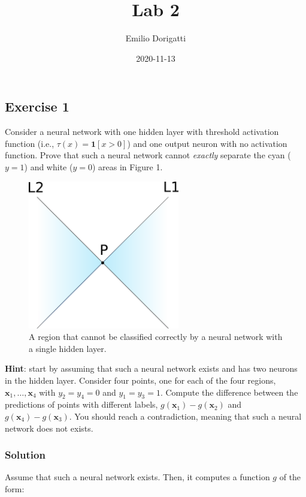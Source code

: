 \documentclass[
]{article}
\title{Lab 2}
\author{Emilio Dorigatti}
\date{2020-11-13}
\begin{document}
\maketitle

\hypertarget{exercise-1}{%
\subsection{Exercise 1}\label{exercise-1}}

Consider a neural network with one hidden layer with threshold
activation function (i.e., \(\tau(x)=\mathbf{1}[x>0]\)) and one output
neuron with no activation function. Prove that such a neural network
cannot \emph{exactly} separate the cyan (\(y=1\)) and white (\(y=0\))
areas in Figure 1.

\begin{figure}
\centering
\includegraphics[width=2.60417in,height=\textheight]{lab2f1.png}
\caption{A region that cannot be classified correctly by a neural
network with a single hidden layer.}
\end{figure}

\textbf{Hint}: start by assuming that such a neural network exists and
has two neurons in the hidden layer. Consider four points, one for each
of the four regions, \(\textbf{x}_1,\ldots,\textbf{x}_4\) with
\(y_2=y_4=0\) and \(y_1=y_3=1\). Compute the difference between the
predictions of points with different labels,
\(g(\textbf{x}_1)-g(\textbf{x}_2)\) and
\(g(\textbf{x}_4)-g(\textbf{x}_3)\). You should reach a contradiction,
meaning that such a neural network does not exists.

\hypertarget{solution}{%
\subsubsection{Solution}\label{solution}}

Assume that such a neural network exists. Then, it computes a function
\(g\) of the form:
\end{document}
